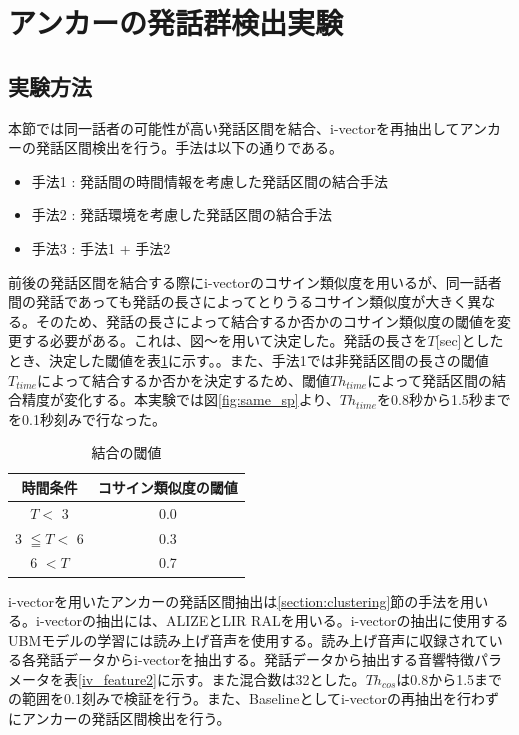 \section{アンカーの発話群検出実験}
\label{chapter:get_anchor}
\subsection{実験方法}
本節では同一話者の可能性が高い発話区間を結合、i-vectorを再抽出してアンカーの発話区間検出を行う。手法は以下の通りである。

\begin{itemize}
\item 手法1 : 発話間の時間情報を考慮した発話区間の結合手法
\item 手法2 : 発話環境を考慮した発話区間の結合手法
\item 手法3 : 手法1 + 手法2
\end{itemize}

前後の発話区間を結合する際にi-vectorのコサイン類似度を用いるが、同一話者間の発話であっても発話の長さによってとりうるコサイン類似度が大きく異なる。そのため、発話の長さによって結合するか否かのコサイン類似度の閾値を変更する必要がある。これは、図〜を用いて決定した。発話の長さを$T$[sec]としたとき、決定した閾値を表\ref{table:decide_thcos}に示す。。また、手法1では非発話区間の長さの閾値$T_{time}$によって結合するか否かを決定するため、閾値$Th_{time}$によって発話区間の結合精度が変化する。本実験では図\ref{fig:same_sp}より、$Th_{time}$を0.8秒から1.5秒までを0.1秒刻みで行なった。

\begin{table}[H]
  \begin{center}
    \caption{結合の閾値 \label{table:decide_thcos}}
    \begin{tabular}{|c||c|} \hline
時間条件 & コサイン類似度の閾値  \\ \hline
$T <$ 3 &  0.0 \\ \hline
3 $\leqq T <$ 6 &  0.3  \\ \hline
6 $< T$ &  0.7 \\ \hline
    \end{tabular}
  \end{center}
\end{table}

i-vectorを用いたアンカーの発話区間抽出は\ref{section:clustering}節の手法を用いる。i-vectorの抽出には、ALIZEとLIR RALを用いる。i-vectorの抽出に使用するUBMモデルの学習には読み上げ音声\cite{ATR}を使用する。読み上げ音声に収録されている各発話データからi-vectorを抽出する。発話データから抽出する音響特徴パラメータを表\ref{iv_feature2}に示す。また混合数は32とした。$Th_{cos}$は0.8から1.5までの範囲を0.1刻みで検証を行う。また、Baselineとしてi-vectorの再抽出を行わずにアンカーの発話区間検出を行う。\par


